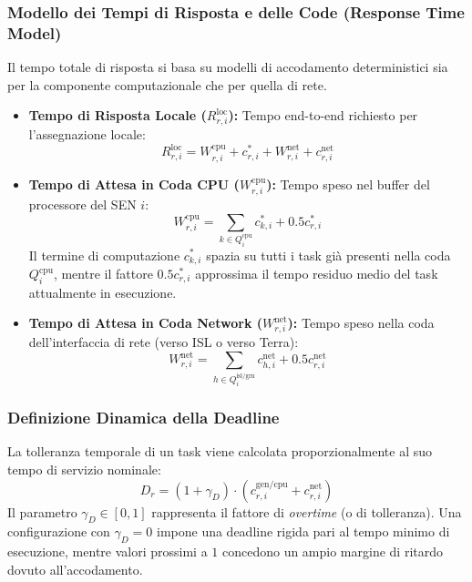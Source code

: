 \documentclass[12pt]{article}
\begin{document}
\subsubsection{Modello dei Tempi di Risposta e delle Code (Response Time Model)}
Il tempo totale di risposta si basa su modelli di accodamento deterministici sia per la componente computazionale che per quella di rete.
\begin{itemize}
    \item \textbf{Tempo di Risposta Locale ($R_{r,i}^{\text{loc}}$):} Tempo end-to-end richiesto per l'assegnazione locale:
    \begin{equation}
    R_{r,i}^{\text{loc}} = W_{r,i}^{\text{cpu}} + c_{r,i}^* + W_{r,i}^{\text{net}} + c_{r,i}^{\text{net}}
    \end{equation}
    
    \item \textbf{Tempo di Attesa in Coda CPU ($W_{r,i}^{\text{cpu}}$):} Tempo speso nel buffer del processore del SEN $i$:
    \begin{equation}
    W_{r,i}^{\text{cpu}} = \sum_{k \in Q_i^{\text{cpu}}} c_{k,i}^* + 0.5 c_{r,i}^*
    \end{equation}
    Il termine di computazione $c_{k,i}^*$ spazia su tutti i task gi\`a presenti nella coda $Q_i^{\text{cpu}}$, mentre il fattore $0.5 c_{r,i}^*$ approssima il tempo residuo medio del task attualmente in esecuzione.
    
    \item \textbf{Tempo di Attesa in Coda Network ($W_{r,i}^{\text{net}}$):} Tempo speso nella coda dell'interfaccia di rete (verso ISL o verso Terra):
    \begin{equation}
    W_{r,i}^{\text{net}} = \sum_{h \in Q_i^{\text{isl/grn}}} c_{h,i}^{\text{net}} + 0.5 c_{r,i}^{\text{net}}
    \end{equation}
\end{itemize}

\subsubsection{Definizione Dinamica della Deadline}
La tolleranza temporale di un task viene calcolata proporzionalmente al suo tempo di servizio nominale:
\begin{equation}
D_r = (1 + \gamma_D) \cdot \left( c_{r,i}^{\text{gen/cpu}} + c_{r,i}^{\text{net}} \right)
\end{equation}
Il parametro $\gamma_D \in [0, 1]$ rappresenta il fattore di \textit{overtime} (o di tolleranza). Una configurazione con $\gamma_D = 0$ impone una deadline rigida pari al tempo minimo di esecuzione, mentre valori prossimi a $1$ concedono un ampio margine di ritardo dovuto all'accodamento.
\end{document}
